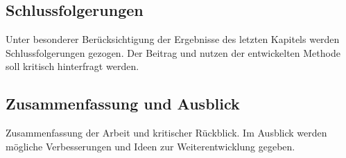 		\subsection{Schlussfolgerungen}
			Unter besonderer Berücksichtigung der Ergebnisse des letzten Kapitels werden Schlussfolgerungen gezogen. 
			Der Beitrag und nutzen der entwickelten Methode soll kritisch hinterfragt werden.

		\subsection{Zusammenfassung und Ausblick}
			Zusammenfassung der Arbeit und kritischer Rückblick. Im Ausblick werden mögliche Verbesserungen und Ideen zur Weiterentwicklung gegeben.  